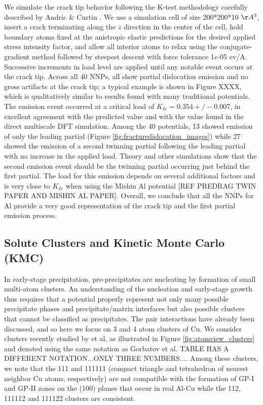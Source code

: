 \documentclass{article}
\begin{document}
We simulate the crack tip behavior following the K-test methodology carefully described by Andric \& Curtin \cite{Andric2019AtomisticFracture}.  We use a simulation cell of size 200*200*10 $\AA^3$, insert a crack terminating along the $z$ direction in the center of the cell, hold boundary atoms fixed at the anistropic elastic predictions for the desired applied stress intensity factor, and allow all interior atoms to relax using the conjugate-gradient method followed by steepest descent with force tolerance 1$e$-05 ev/A.  Successive increments in load level are applied until any notable event occurs at the crack tip.
Across all 40 NNPs, all show partial dislocation emission and no gross artifacts at the crack tip; a typical example is shown in Figure XXXX, which is qualitatively similar to results found with many traditional potentials.  The emission event occurred at a critical load of $K_{Ie}=0.354+/-0.007$, in excellent agreement with the predicted value and with the value found in the direct multiscale DFT simulation.  Among the 40 potentials, 13 showed emission of only the leading partial (Figure \ref{fig:fracturedislocation_images}) while 27 showed the emission of a second twinning partial following the leading partial with no increase in the applied load.  Theory and other simulations show that the second emission event should be the twinning partial occurring just behind the first partial.  The load for this emission depends on several additional factors and is very close to $K_{Ie}$ when using the Mishin Al potential [REF PREDRAG TWIN PAPER AND MISHIN AL PAPER].   Overall, we conclude that all the NNPs for Al provide a very good representation of the crack tip and the first partial emission process.


\subsection{Solute Clusters and Kinetic Monte Carlo (KMC)} \label{sct:solute_clusters_KMC}

In early-stage precipitation, pre-precipitates are nucleating by formation of small multi-atom clusters.  An understanding of the nucleation and early-stage growth thus requires that a potential properly represent not only many possible precipitate phases and precipitate/matrix interfaces but also possible clusters that cannot be classified as precipitates.   The pair interactions have already been discussed, and so here we focus on 3 and 4 atom clusters of Cu.  We consider clusters recently studied by \cite{Gorbatov2019EffectiveAlloys} et al. as illustrated in Figure \ref{fig:atomview_clusters} and denoted using the same notation as Gorbatov et al. TABLE HAS A DIFFERENT NOTATION...ONLY THREE NUMBERS.... Among these clusters, we note that the 111 and 111111 (compact triangle and tetrahedron of nearest neighbor Cu atoms, respectively) are not compatible with the formation of GP-I and GP-II zones on the (100) planes that occur in real Al-Cu while the 112, 111112 and 111122 clusters are consistent.
\end{document}
